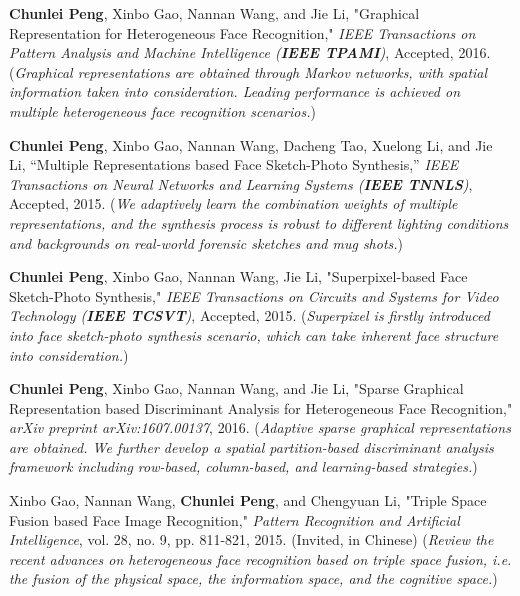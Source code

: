 \documentclass[11pt]{article}
\begin{document}
\begin{bibenum}
\item \textbf{Chunlei Peng}, Xinbo Gao, Nannan Wang, and Jie Li, "Graphical Representation for Heterogeneous Face Recognition," \emph{IEEE Transactions on Pattern Analysis and Machine Intelligence (\textbf{IEEE TPAMI})}, Accepted, 2016.
    (\emph{Graphical representations are obtained through Markov networks, with spatial information taken into consideration. Leading performance is achieved on multiple heterogeneous face recognition scenarios.})

\item \textbf{Chunlei Peng}, Xinbo Gao, Nannan Wang, Dacheng Tao, Xuelong Li, and Jie Li, ``Multiple Representations based Face Sketch-Photo Synthesis,'' \emph{IEEE Transactions on Neural Networks and Learning Systems (\textbf{IEEE TNNLS})}, Accepted, 2015.
    (\emph{We adaptively learn the combination weights of multiple representations, and the synthesis process is robust to different lighting conditions and backgrounds on real-world forensic sketches and mug shots.})

\item \textbf{Chunlei Peng}, Xinbo Gao, Nannan Wang, Jie Li, "Superpixel-based Face Sketch-Photo Synthesis," \emph{IEEE Transactions on Circuits and Systems for Video Technology (\textbf{IEEE TCSVT})}, Accepted, 2015.
    (\emph{Superpixel is firstly introduced into face sketch-photo synthesis scenario, which can take inherent face structure into consideration.})

\item \textbf{Chunlei Peng}, Xinbo Gao, Nannan Wang, and Jie Li, "Sparse Graphical Representation based Discriminant Analysis for Heterogeneous Face Recognition," \emph{arXiv preprint arXiv:1607.00137}, 2016.
    (\emph{Adaptive sparse graphical representations are obtained. We further develop a spatial partition-based discriminant analysis framework including row-based, column-based, and learning-based strategies.})

\item Xinbo Gao, Nannan Wang, \textbf{Chunlei Peng}, and Chengyuan Li, "Triple Space Fusion based Face Image Recognition," \emph{Pattern Recognition and Artificial Intelligence}, vol. 28, no. 9, pp. 811-821, 2015. (Invited, in Chinese)
    (\emph{Review the recent advances on heterogeneous face recognition based on triple space fusion, i.e. the fusion of the physical space, the information space, and the cognitive space.})

\end{bibenum}
\end{document}
